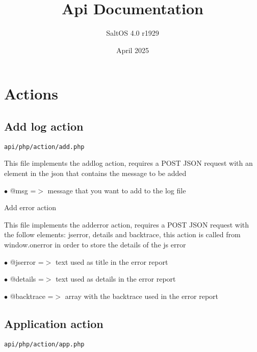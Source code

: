 \documentclass[a4paper]{article}
\title{Api Documentation}
\author{SaltOS 4.0 r1929}
\begin{document}
\date{April 2025}
\maketitle
\clearpage

\tableofcontents
\clearpage


\hypertarget{toc1}{}
\section{Actions}

\hypertarget{toc2}{}
\subsection{Add log action}

\begin{lstlisting}
api/php/action/add.php
\end{lstlisting}

This file implements the addlog action, requires a POST JSON request
with an element in the json that contains the message to be added

\begin{compactitem}
\item[\color{myblue}$\bullet$] @msg =$>$ message that you want to add to the log file
\end{compactitem}

Add error action

This file implements the adderror action, requires a POST JSON request
with the follow elements: jserror, details and backtrace, this action
is called from window.onerror in order to store the details of the js
error

\begin{compactitem}
\item[\color{myblue}$\bullet$] @jserror   =$>$ text used as title in the error report
\item[\color{myblue}$\bullet$] @details   =$>$ text used as details in the error report
\item[\color{myblue}$\bullet$] @backtrace =$>$ array with the backtrace used in the error report
\end{compactitem}

\hypertarget{toc3}{}
\subsection{Application action}

\begin{lstlisting}
api/php/action/app.php
\end{lstlisting}
\end{document}
